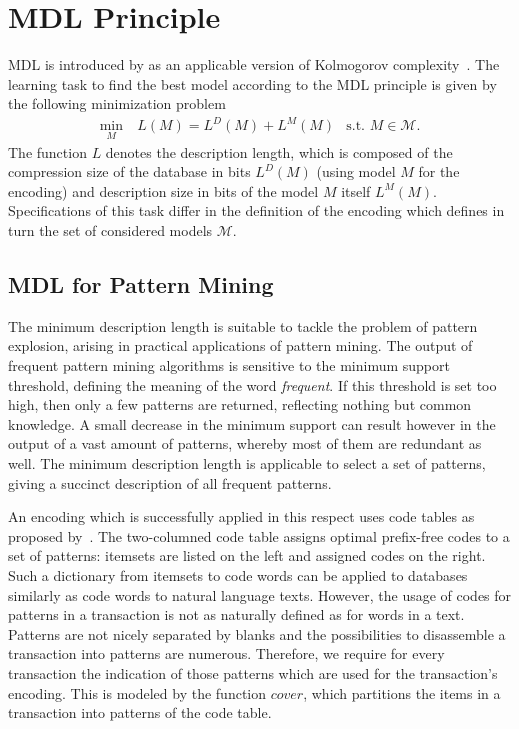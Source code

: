\section{MDL Principle}
MDL is introduced by \cite{rissanen1978modeling} as an applicable version of Kolmogorov complexity~\citep{li2008introduction,grunwald2007minimum}.
The learning task to find the best model according to the MDL principle is given by the following minimization problem 
\begin{align*}
    	\min_M&\ L(M) = L^D(M) + L^M(M) &\text{s.t. } M\in\mathcal{M}.
\end{align*} 
The function $L$ denotes the description length, which is composed of the compression size of the database in bits $L^D(M)$ (using model $M$ for the encoding) and description size in bits of the model $M$ itself $L^M(M)$.
Specifications of this task differ in the definition of the encoding which defines in turn the set of considered models $\mathcal{M}$. 
\subsection{MDL for Pattern Mining}
The minimum description length is suitable to tackle the problem of pattern explosion, arising in practical applications of pattern mining. The output of frequent pattern mining algorithms is sensitive to the minimum support threshold, defining the meaning of the word \emph{frequent}. If this threshold is set too high, then only a few patterns are returned, reflecting nothing but common knowledge. A small decrease in the minimum support can result however in the output of a vast amount of patterns, whereby most of them are redundant as well. The minimum description length is applicable to select a set of patterns, giving a succinct description of all frequent patterns.   

An encoding which is successfully applied in this respect uses code tables  as proposed by~\cite{siebes2006item}. 
The two-columned code table assigns optimal prefix-free codes to a set of patterns: itemsets are listed on the left and assigned codes on the right. Such a dictionary from itemsets to code words can be applied to databases similarly as code words to natural language texts. However, the usage of codes for patterns in a transaction is not as naturally defined as for words in a text. Patterns are not nicely separated by blanks and the possibilities to disassemble a transaction into patterns are numerous. Therefore, we require for every transaction the indication of those patterns  which are used for the transaction's encoding. This is modeled by the function $cover$, which partitions the items in a transaction into patterns of the code table. 

